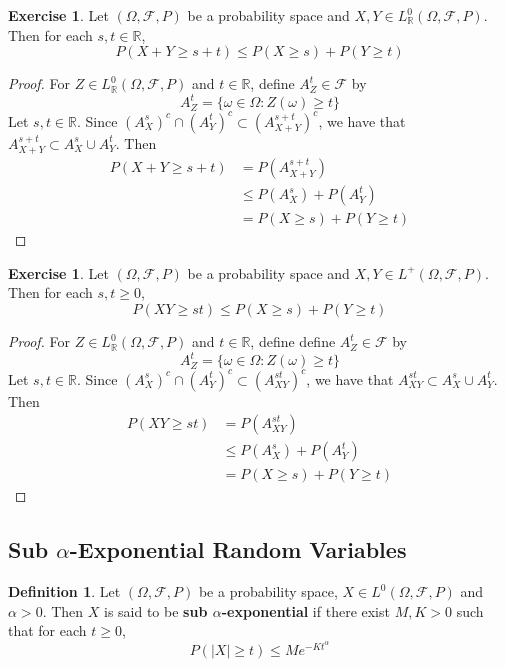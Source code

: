 \documentclass[12pt]{amsart}
\theoremstyle{definition}
\newtheorem{defn}[definition]{Definition}
\newtheorem{ex}[definition]{Exercise}
\newcommand{\al}{\alpha}
\newcommand{\om}{\omega}
\newcommand{\Om}{\Omega}
\newcommand{\R}{\mathbb{R}}
\newcommand{\MF}{\mathcal{F}}
\begin{document}
	\begin{ex}
		Let $(\Om, \MF, P)$ be a probability space and $X,Y \in L^0_{\R}(\Om, \MF, P)$. Then for each $s, t \in \R$, 
		$$P(X + Y \geq s + t) \leq P(X \geq s) + P(Y \geq t) $$ 
	\end{ex}

	\begin{proof}
		For $Z \in L^0_{\R}(\Om, \MF, P)$ and $t \in \R$, define $A_Z^t \in \MF$ by 
		$$A_Z^t = \{\om \in \Om : Z(\om) \geq t\}$$ 
		Let $s,t \in \R$. Since $(A_X^s)^c \cap (A_Y^t)^c \subset (A_{X+Y}^{s+t})^c$, we have that $A_{X+Y}^{s+t} \subset A_X^s \cup A_Y^t$. Then 
		\begin{align*}
			P(X + Y \geq s + t)
			& = P(A_{X+Y}^{s+t}) \\
			& \leq P(A_X^s) + P(A_Y^t) \\
			& = P(X \geq s) + P(Y \geq t)
		\end{align*} 
	\end{proof}

	\begin{ex}
		Let $(\Om, \MF, P)$ be a probability space and $X,Y \in L^+(\Om, \MF, P)$. Then for each $s, t \geq 0$, 
		$$P(XY \geq st) \leq P(X \geq s) + P(Y \geq t) $$ 
	\end{ex}
	
	\begin{proof}
		For $Z \in L^0_{\R}(\Om, \MF, P)$ and $t \in \R$, define define $A_Z^t \in \MF$ by 
		$$A_Z^t = \{\om \in \Om : Z(\om) \geq t\}$$ 
		Let $s,t \in \R$. Since $(A_X^s)^c \cap (A_Y^t)^c \subset (A_{XY}^{st})^c$, we have that $A_{XY}^{st} \subset A_X^s \cup A_Y^t$. Then 
		\begin{align*}
			P(XY \geq st)
			& = P(A_{XY}^{st}) \\
			& \leq P(A_X^s) + P(A_Y^t) \\
			& = P(X \geq s) + P(Y \geq t)
		\end{align*} 
	\end{proof}

	
	
	\subsection{Sub $\al$-Exponential Random Variables}
	
	\begin{defn}
		Let $(\Om, \MF, P)$ be a probability space, $X \in L^0(\Om, \MF, P)$ and $\al >0$. Then $X$ is said to be \textbf{sub $\al$-exponential} if there exist $M, K > 0$ such that for each $t \geq 0$, $$P(|X| \geq t) \leq Me^{-Kt^{\al}}$$
	\end{defn}
	
\end{document}

